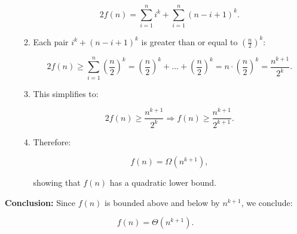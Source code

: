 \begin{example}
\begin{enumerate}
\begin{enumerate}
                \[
                2f(n) = \sum_{i=1}^n i^k + \sum_{i=1}^n (n-i+1)^k.
                \]
                
                \item Each pair \( i^k + (n-i+1)^k \) is greater than or equal to \( \left(\frac{n}{2}\right)^k \):
                
                \[
                2f(n) \geq \sum_{i=1}^n \left(\frac{n}{2}\right)^k = \left(\frac{n}{2}\right)^k + \ldots + \left(\frac{n}{2}\right)^k = n \cdot \left(\frac{n}{2}\right)^k = \frac{n^{k+1}}{2^k}.
                \]
                
                \item This simplifies to:
                
                \[
                2f(n) \geq \frac{n^{k+1}}{2^k} \Rightarrow f(n) \geq \frac{n^{k+1}}{2^{k+1}}.
                \]
                
                \item Therefore:
                
                \[
                f(n) = \Omega(n^{k+1}),
                \]
                
                showing that \( f(n) \) has a quadratic lower bound.
                
            \end{enumerate}

        \end{enumerate}

        \textbf{Conclusion:} Since \( f(n) \) is bounded above and below by \( n^{k+1} \), we conclude:

        \[
        f(n) = \Theta(n^{k+1}).
        \]
    \end{example}


